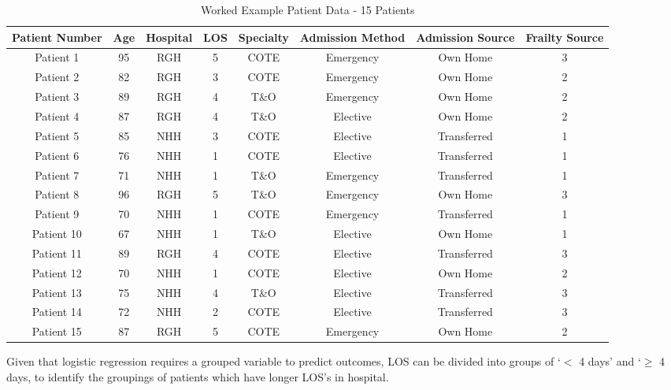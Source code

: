 \documentclass[../thesis.tex]{subfiles}
\begin{document}
\begin{table}[h!]
    \centering
    \begin{adjustbox}{width=\columnwidth}
    \begin{tabular}{cccccccc}\toprule
       \textbf{Patient Number}  & \textbf{Age} & \textbf{Hospital} & \textbf{LOS} & \textbf{Specialty} &\textbf{Admission Method} & \textbf{Admission Source} & \textbf{Frailty Source} \\\midrule
        Patient 1 & 95 & RGH & 5 & COTE & Emergency & Own Home & 3 \\ 
        Patient 2 & 82 & RGH & 3 & COTE & Emergency & Own Home & 2 \\
        Patient 3 & 89 & RGH & 4& T\&O & Emergency & Own Home & 2 \\
        Patient 4 & 87 & RGH & 4 & T\&O & Elective & Own Home & 2 \\
        Patient 5 & 85 & NHH & 3 & COTE & Elective & Transferred & 1 \\
        Patient 6 & 76 & NHH & 1 & COTE & Elective & Transferred & 1\\
        Patient 7 & 71 & NHH & 1 & T\&O & Emergency & Transferred & 1 \\
        Patient 8 & 96 & RGH & 5 & T\&O & Emergency & Own Home & 3 \\
        Patient 9 & 70 & NHH & 1 & COTE & Emergency & Transferred & 1\\
        Patient 10 & 67 & NHH & 1 & T\&O & Elective & Own Home & 1\\
        Patient 11 & 89 & RGH & 4 & COTE & Elective & Transferred & 3\\
        Patient 12 & 70 & NHH & 1 & COTE & Elective & Own Home & 2\\
        Patient 13 & 75 & NHH & 4 & T\&O & Elective & Transferred & 3\\
        Patient 14 & 72 & NHH & 2 & COTE & Elective & Transferred & 3\\
        Patient 15 & 87 & RGH & 5 & COTE & Emergency & Own Home & 2\\\bottomrule
    \end{tabular}
    \end{adjustbox}
    \caption{Worked Example Patient Data - 15 Patients}
    \label{tab:WETableExtended}
\end{table}

Given that logistic regression requires a grouped variable to predict outcomes, LOS can be divided into groups of `$<$ 4 days' and `$\geq$ 4 days, to identify the groupings of patients which have longer LOS's in hospital.
\end{document}
